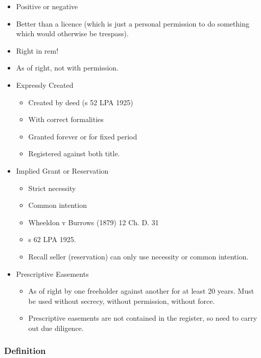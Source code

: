 \documentclass[
]{article}
\providecommand{\tightlist}{%
  \setlength{\itemsep}{0pt}\setlength{\parskip}{0pt}}
\begin{document}
\begin{itemize}
\tightlist
\item
  Positive or negative
\item
  Better than a licence (which is just a personal permission to do
  something which would otherwise be trespass).
\item
  Right in rem!
\item
  As of right, not with permission.
\item
  Expressly Created

  \begin{itemize}
  \tightlist
  \item
    Created by deed (s 52 LPA 1925)
  \item
    With correct formalities
  \item
    Granted forever or for fixed period
  \item
    Registered against both title.
  \end{itemize}
\item
  Implied Grant or Reservation

  \begin{itemize}
  \tightlist
  \item
    Strict necessity
  \item
    Common intention
  \item
    Wheeldon v Burrows (1879) 12 Ch. D. 31
  \item
    s 62 LPA 1925.
  \item
    Recall seller (reservation) can only use necessity or common
    intention.
  \end{itemize}
\item
  Prescriptive Easements

  \begin{itemize}
  \tightlist
  \item
    As of right by one freeholder against another for at least 20 years.
    Must be used without secrecy, without permission, without force.
  \item
    Prescriptive easements are not contained in the register, so need to
    carry out due diligence.
  \end{itemize}
\end{itemize}

\hypertarget{definition}{%
\subsubsection{Definition}\label{definition}}
\end{document}
